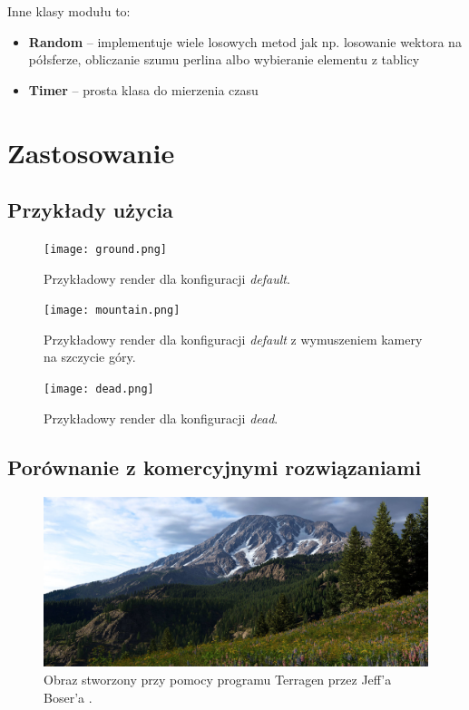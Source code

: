 \documentclass[inz,longabstract]{iithesis}
\begin{document}
            Inne klasy modułu to:
            \begin{itemize}
                \item \textbf{Random} -- implementuje wiele losowych metod jak np. losowanie wektora na półsferze, obliczanie szumu perlina albo wybieranie elementu z tablicy
                \item \textbf{Timer} -- prosta klasa do mierzenia czasu  
            \end{itemize}
            
\chapter{Zastosowanie}
    \section{Przykłady użycia}
        \begin{figure}[H]
            \texttt{[image: ground.png]}
            \caption{Przykładowy render dla konfiguracji \textit{default}.} 
            \label{fig:ground}
        \end{figure}
        
        \begin{figure}[H]
            \texttt{[image: mountain.png]}
            \caption{Przykładowy render dla konfiguracji \textit{default} z wymuszeniem kamery na szczycie góry.} 
            \label{fig:mountain}
        \end{figure}
        
        \begin{figure}[H] 
            \texttt{[image: dead.png]}
            \caption{Przykładowy render dla konfiguracji \textit{dead}.} 
            \label{fig:dead}
        \end{figure}
        
    \section{Porównanie z komercyjnymi rozwiązaniami}
        \begin{figure}[H] 
            \includegraphics[width=\linewidth]{terragen.png}
            \caption{Obraz stworzony przy pomocy programu Terragen przez Jeff'a Boser'a \cite{terragen}.} 
            \label{fig:terragen}
        \end{figure}
        
\end{document}
